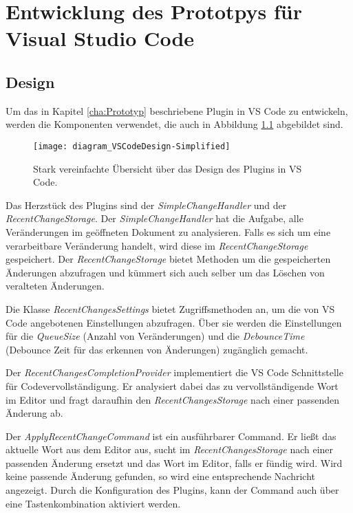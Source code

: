 \chapter{Entwicklung des Prototpys für Visual Studio Code}
\label{cha:EntwicklungVsCode}

\section{Design}
\label{sec:EntwicklungVsCode_Design}

Um das in Kapitel \ref{cha:Prototyp} beschriebene Plugin in VS Code
zu entwickeln, werden die Komponenten verwendet, die auch in 
Abbildung \ref{fig:diagram_VSCodeDesign-Simplified} abgebildet sind.
\begin{figure}
    \centering
    \texttt{[image: diagram\_VSCodeDesign-Simplified]}
    \caption{Stark vereinfachte Übersicht über das Design des Plugins in  VS Code.}
    \label{fig:diagram_VSCodeDesign-Simplified}
\end{figure}  

Das Herzstück des Plugins sind der \emph{SimpleChangeHandler} und
der \emph{RecentChangeStorage}. Der \emph{SimpleChangeHandler} hat die Aufgabe,
alle Veränderungen im geöffneten Dokument zu analysieren. Falls es sich um
eine verarbeitbare Veränderung handelt, wird diese im \emph{RecentChangeStorage}
gespeichert. Der \emph{RecentChangeStorage} bietet Methoden um die
gespeicherten Änderungen abzufragen und kümmert sich auch selber um das
Löschen von veralteten Änderungen.

Die Klasse \emph{RecentChangesSettings} bietet Zugriffsmethoden an,
um die von VS Code angebotenen Einstellungen abzufragen. Über sie
werden die Einstellungen für die \emph{QueueSize} (Anzahl von Veränderungen)
und die \emph{DebounceTime} (Debounce Zeit für das erkennen von Änderungen)
zugänglich gemacht.

Der \emph{RecentChangesCompletionProvider} implementiert die VS Code Schnittstelle
für Codevervollständigung. Er analysiert dabei das zu vervollständigende Wort
im Editor und fragt daraufhin den \emph{RecentChangesStorage} nach einer passenden
Änderung ab.

Der \emph{ApplyRecentChangeCommand} ist ein ausführbarer Command. Er ließt
das aktuelle Wort aus dem Editor aus, sucht im \emph{RecentChangesStorage}
nach einer passenden Änderung ersetzt und das Wort im Editor, falls
er fündig wird. Wird keine passende Änderung gefunden, so wird eine entsprechende
Nachricht angezeigt. Durch die Konfiguration des Plugins, kann der
Command auch über eine Tastenkombination aktiviert werden.

